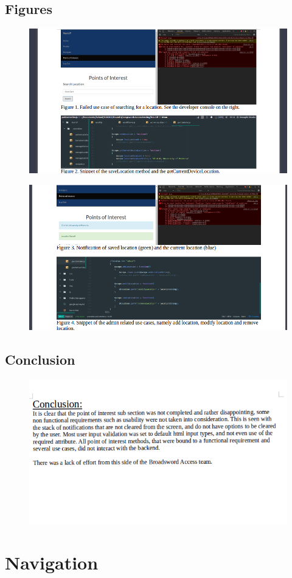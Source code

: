 \documentclass[english]{article}
\begin{document}
\subsection{Figures}
\begin{figure}[ht!]
\hspace*{-2.5cm}
\includegraphics[width=180cm]{fig1-2-poi.png}
\end{figure}
\begin{figure}[ht!]
\hspace*{-2.5cm}
\includegraphics[width=180cm]{fig3-4-poi.png}
\end{figure}
\subsection{Conclusion}
\begin{figure}[ht!]
\hspace*{-2.5cm}
\includegraphics[width=180cm]{conclusion-poi.png}
\end{figure}
\section{Navigation}
\end{document}
